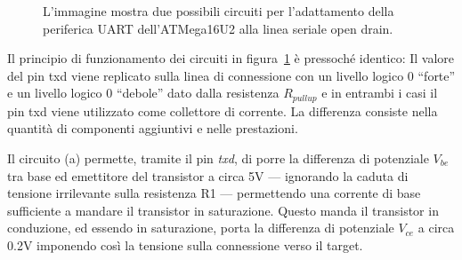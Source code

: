 \begin{figure}[t]
    \centering

    \caption[]{L'immagine mostra due possibili circuiti per l'adattamento della periferica UART dell'ATMega16U2 alla linea seriale open drain.}\label{fig:od-impl}
\end{figure}

Il principio di funzionamento dei circuiti in figura~\ref{fig:od-impl} è pressoché identico: Il valore del pin txd viene replicato sulla linea di connessione con un livello logico 0 ``forte'' e un livello logico 0 ``debole'' dato dalla resistenza \(R_{pullup}\) e in entrambi i casi il pin txd viene utilizzato come collettore di corrente.
La differenza consiste nella quantità di componenti aggiuntivi e nelle prestazioni.

Il circuito (a) permette, tramite il pin \textit{txd}, di porre la differenza di potenziale \(V_{be}\) tra base ed emettitore del transistor a circa 5V --- ignorando la caduta di tensione irrilevante sulla resistenza R1 --- permettendo una corrente di base sufficiente a mandare il transistor in saturazione. Questo manda il transistor in conduzione, ed essendo in saturazione, porta la differenza di potenziale \(V_{ce}\) a circa 0.2V imponendo così la tensione sulla connessione verso il target.

